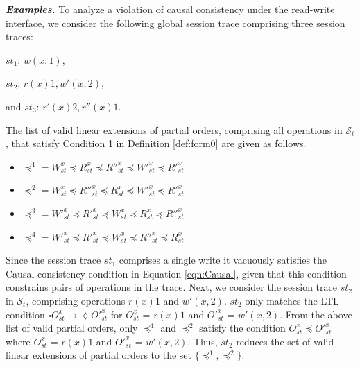 \documentclass[journal, compsoc]{IEEEtran}
\begin{document}
	\noindent \emph{\textbf{Examples.}}
	To analyze a violation of causal consistency under the read-write interface, we consider the following global session trace comprising three  session traces:
	
	$\mathit{st}_1$: $w(x,1)$, %
	
	$\mathit{st}_2$: $r(x){1}, w'(x,2)$, %
	
	and  $\mathit{st}_3$: $r'(x){2}, r''(x){1}$.
	
	The list of valid linear extensions of partial orders, comprising all operations in $\mathcal{S}_t$, that satisfy Condition 1 in Definition \ref{def:form0} are given as follows.
	\begin{itemize}
		\item $\preccurlyeq^1 = W^x_{\mathit{st}}   \preccurlyeq R^x_{\mathit{st}}  \preccurlyeq R''^x_{\mathit{st}}  \preccurlyeq W'^x_{\mathit{st}}   \preccurlyeq R'^x_{\mathit{st}} $
		\item $\preccurlyeq^2 = W^x_{\mathit{st}}   \preccurlyeq R''^x_{\mathit{st}}  \preccurlyeq R^x_{\mathit{st}}   \preccurlyeq W'^x_{\mathit{st}}  \preccurlyeq R'^x_{\mathit{st}}$
		\item $\preccurlyeq^3 = W'^x_{\mathit{st}}  \preccurlyeq R'^x_{\mathit{st}} \preccurlyeq  W^x_{\mathit{st}}  \preccurlyeq R^x_{\mathit{st}} \preccurlyeq R''^x_{\mathit{st}}$
		\item $\preccurlyeq^4 = W'^x_{\mathit{st}}  \preccurlyeq R'^x_{\mathit{st}} \preccurlyeq W^x_{\mathit{st}}  \preccurlyeq R''^x_{\mathit{st}} \preccurlyeq R^x_{\mathit{st}}  $
	\end{itemize} %
	Since the session trace  $\mathit{st}_1$ comprises a single write it vacuously satisfies the Causal consistency condition  in Equation \ref{eqn:Causal}, given that this condition constrains pairs of operations in the trace.
	Next, we consider the  session trace $\mathit{st}_2$ in $\mathcal{S}_t$, comprising operations $r(x){1}$ and $w'(x,2)$. $\mathit{st}_2$ only matches the LTL condition $ \square {\mathit{O}}^x_{\mathit{st}} \rightarrow \lozenge {\mathit{O}}'^x_{\mathit{st}}$ for ${\mathit{O}}^x_{\mathit{st}}$ = $r(x){1}$ and  ${\mathit{O}}'^x_{\mathit{st}}$ = $w'(x,2)$.  From the above list of valid partial orders, only $\preccurlyeq^1$ and $\preccurlyeq^2$ satisfy the  condition ${\mathit{O}}^x_{\mathit{st}} \preccurlyeq {\mathit{O}}'^x_{\mathit{st}}$ where ${\mathit{O}}^x_{\mathit{st}}$ = $r(x){1}$ and  ${\mathit{O}}'^x_{\mathit{st}}$ = $w'(x,2)$. Thus, $\mathit{st}_2$ reduces the set of valid linear extensions of partial orders to the set $\{\preccurlyeq^1, \preccurlyeq^2\}$.
\end{document}
